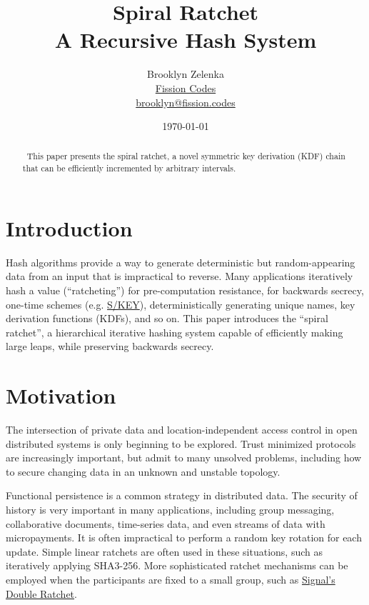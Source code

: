 \documentclass{article}
\title{Spiral Ratchet \\[1ex] \large A Recursive Hash System}
\author{Brooklyn Zelenka \\ \href{https://fission.codes}{Fission Codes} \\ \href{mailto:brooklyn@fission.codes}{brooklyn@fission.codes} }
\date{\today}
\begin{document}
    \maketitle
   	\begin{abstract}\
   		This paper presents the spiral ratchet, a novel symmetric key derivation (KDF) chain that can be efficiently incremented by arbitrary intervals.
   	\end{abstract}

   	\section{Introduction}
   	
	Hash algorithms provide a way to generate deterministic but random-appearing data from an input that is impractical to reverse. Many applications iteratively hash a value (``ratcheting'') for pre-computation resistance, for backwards secrecy, one-time schemes (e.g. \href{https://datatracker.ietf.org/doc/html/rfc1760}{S/KEY}), deterministically generating unique names, key derivation functions (KDFs), and so on. This paper introduces the ``spiral ratchet'', a hierarchical iterative hashing system capable of efficiently making large leaps, while preserving backwards secrecy.

    \section{Motivation}
    
    The intersection of private data and location-independent access control in open distributed systems is only beginning to be explored. Trust minimized protocols are increasingly important, but admit to many unsolved problems, including how to secure changing data in an unknown and unstable topology.
    
    Functional persistence is a common strategy in distributed data. The security of history is very important in many applications, including group messaging, collaborative documents, time-series data, and even streams of data with micropayments. It is often impractical to perform a random key rotation for each update. Simple linear ratchets are often used in these situations, such as iteratively applying SHA3-256. More sophisticated ratchet mechanisms can be employed when the participants are fixed to a small group, such as \href{https://signal.org/docs/specifications/doubleratchet/doubleratchet.pdf}{Signal's Double Ratchet}.
    
\end{document}
